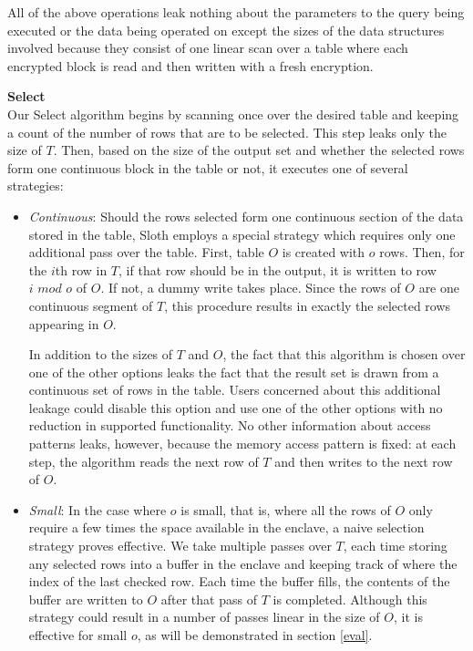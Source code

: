 \documentclass[USenglish,oneside,twocolumn]{article}
\def\name/{Sloth}
\begin{document}
All of the above operations leak nothing about the parameters to the query being executed or the data being operated on except the sizes of the data structures involved because they consist of one linear scan over a table where each encrypted block is read and then written with a fresh encryption. 

\medskip \noindent \textbf{Select}\\
Our Select algorithm begins by scanning once over the desired table and keeping a count of the number of rows that are to be selected. This step leaks only the size of $T$. Then, based on the size of the output set and whether the selected rows form one continuous block in the table or not, it executes one of several strategies:
\begin{itemize}
\item \textit{Continuous}: Should the rows selected form one continuous section of the data stored in the table, \name/ employs a special strategy which requires only one additional pass over the table. First, table $O$ is created with $o$ rows. Then, for the $i$th row in $T$, if that row should be in the output, it is written to row $i\textit{ mod }o$ of $O$. If not, a dummy write takes place. Since the rows of $O$ are one continuous segment of $T$, this procedure results in exactly the selected rows appearing in $O$. 

In addition to the sizes of $T$ and $O$, the fact that this algorithm is chosen over one of the other options leaks the fact that the result set is drawn from a continuous set of rows in the table. Users concerned about this additional leakage could disable this option and use one of the other options with no reduction in supported functionality. No other information about access patterns leaks, however, because the memory access pattern is fixed: at each step, the algorithm reads the next row of $T$ and then writes to the next row of $O$. 

\item \textit{Small}: In the case where $o$ is small, that is, where all the rows of $O$ only require a few times the space available in the enclave, a naive selection strategy proves effective. We take multiple passes over $T$, each time storing any selected rows into a buffer in the enclave and keeping track of where the index of the last checked row. Each time the buffer fills, the contents of the buffer are written to $O$ after that pass of $T$ is completed. Although this strategy could result in a number of passes linear in the size of $O$, it is effective for small $o$, as will be demonstrated in section \ref{eval}.


\end{itemize}
\end{document}
